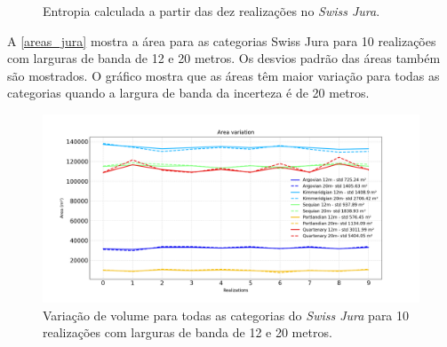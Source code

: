 \begin{figure}[H] 
    \centering
    \caption{Entropia calculada a partir das dez realizações no \textit{Swiss Jura}.} \label{jura_entropy}
     \hspace{1em}
\end{figure}

A \autoref{areas_jura} mostra a área para as categorias Swiss Jura para 10 realizações com larguras de banda de 12 e 20 metros. Os desvios padrão das áreas também são mostrados. O gráfico mostra que as áreas têm maior variação para todas as categorias quando a largura de banda da incerteza é de 20 metros.

\begin{figure}[H]
	\caption{\label{areas_jura} Variação de volume para todas as categorias do \textit{Swiss Jura} para 10 realizações com larguras de banda de 12 e 20 metros.}
	\centering
		\includegraphics[width=\textwidth]{capitulo_3/imagens/areasjura.png}
\end{figure}

